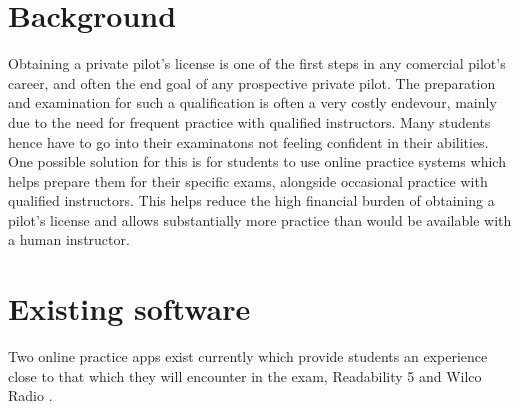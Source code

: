 \section{Background}
Obtaining a private pilot's license is one of the first steps in any comercial pilot's career, and often the end goal of any prospective private pilot.
The preparation and examination for such a qualification is often a very costly endevour, mainly due to the need for frequent practice with qualified instructors.
Many students hence have to go into their examinatons not feeling confident in their abilities.
\\
One possible solution for this is for students to use online practice systems which helps prepare them for their specific exams, alongside occasional practice with qualified instructors.
This helps reduce the high financial burden of obtaining a pilot's license and allows substantially more practice than would be available with a human instructor.
\section{Existing software}
Two online practice apps exist currently which provide students an experience close to that which they will encounter in the exam, Readability 5 \cite{readability} and Wilco Radio \cite{wilcoradio}.
